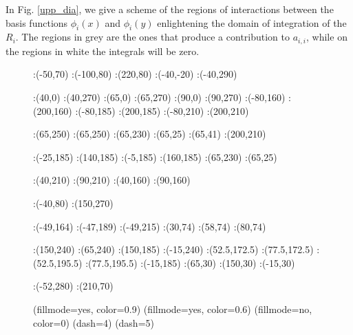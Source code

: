 {In Fig. \ref{upp_dia}, we give a scheme of the regions of interactions between the basis functions $\phi_i(x)$ and $\phi_i(y)$ enlightening the domain of integration of the $R_i$. The regions in grey are the ones that produce a contribution to $a_{i,i}$, while on the regions in white the integrals will be zero.
\begin{figure}
\figinit{0.7pt}
:(-50,70)
:(-100,80) :(220,80)
:(-40,-20) :(-40,290)

:(40,0) :(40,270)
:(65,0) :(65,270)
:(90,0) :(90,270)
%
:(-80,160) :(200,160)
:(-80,185) :(200,185)
:(-80,210) :(200,210)

:(65,250) :(65,250)
:(65,230) :(65,25)
:(65,41) :(200,210)

:(-25,185) :(140,185)
:(-5,185) :(160,185)
:(65,230) :(65,25)

%

:(40,210) :(90,210)
:(40,160) :(90,160)

:(-40,80) :(150,270)

:(-49,164) :(-47,189) :(-49,215) 
:(30,74) :(58,74) :(80,74) 

:(150,240) :(65,240) :(150,185) 
:(-15,240) :(52.5,172.5) :(77.5,172.5) 
:(52.5,195.5) :(77.5,195.5) :(-15,185) 
:(65,30) :(150,30) :(-15,30) 

:(-52,280) :(210,70)


\figdrawbegin{}

\figset(fillmode=yes, color=0.9)
\figdrawline[29,30,10,6,29]
\figdrawline[30,32,12,16,30]
\figdrawline[32,31,5,9,32]
\figdrawline[31,11,15,29,31]
\figset(fillmode=yes, color=0.6)
\figdrawline[29,30,32,31,29]
\figset(fillmode=no, color=0)
\figdrawarrow[1,2]
\figdrawarrow[3,4]
\figdrawline[5,6]
\figdrawline[9,10]
\figdrawline[11,12]
\figdrawline[15,16]
\figset(dash=4)
\figdrawline[7,56]
\figdrawline[57,55]
\figdrawline[53,8]
\figdrawline[13,59]
\figdrawline[60,61]
\figdrawline[62,14]
\figset(dash=5)
\figdrawline[33,34]
\figdrawend


\end{figure}}
